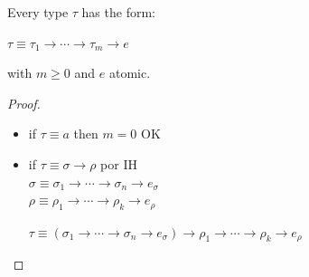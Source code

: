 \begin{frame}
 
 \begin{lem}
   Every type $\tau$ has the form:
   \begin{center}
         $\tau \equiv \tau_1 \rightarrow \cdots \rightarrow \tau_m \rightarrow e$
   \end{center}
  with $m \geq 0$ and $e$ atomic.
\end{lem}
 
\begin{proof}
 \begin{itemize}
  \item if $\tau \equiv a$ then $m = 0$ OK
  \item if $\tau \equiv \sigma \to \rho$ por IH\\
   $\sigma \equiv \sigma_1 \to \cdots \to \sigma_n \to e_{\sigma}$\\
   $\rho \equiv \rho_1 \to \cdots \to \rho_k \to e_{\rho}$\\
   \begin{center}
   $\tau \equiv (\sigma_1 \to \cdots \to \sigma_n \to e_{\sigma}) \to \rho_1 \to \cdots \to \rho_k \to e_{\rho}$
   \end{center}
   
 \end{itemize}
 
\end{proof}
 
\end{frame}


